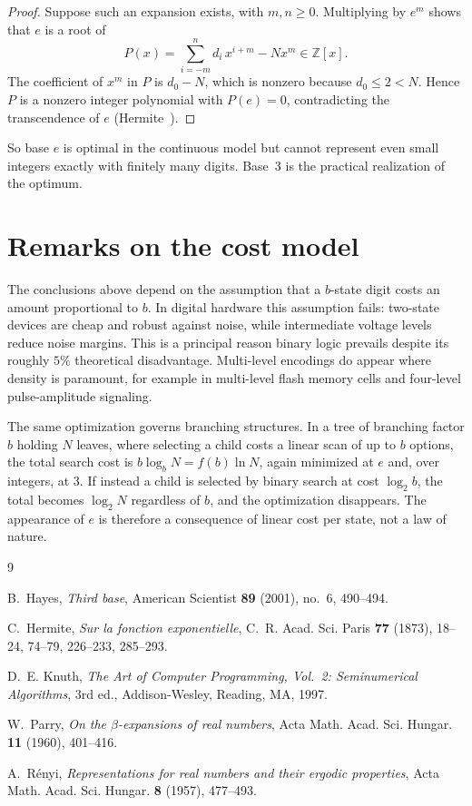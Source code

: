 \documentclass[11pt]{amsart}
\theoremstyle{definition}
\theoremstyle{remark}
\numberwithin{equation}{section}
\begin{document}
\begin{proof}
Suppose such an expansion exists, with $m,n\ge 0$. Multiplying by $e^m$ shows
that $e$ is a root of
\[
  P(x) = \sum_{i=-m}^{n} d_i\, x^{i+m} - N x^m \in \mathbb{Z}[x].
\]
The coefficient of $x^m$ in $P$ is $d_0 - N$, which is nonzero because
$d_0\le 2<N$. Hence $P$ is a nonzero integer polynomial with $P(e)=0$,
contradicting the transcendence of $e$ (Hermite~\cite{hermite}).
\end{proof}

So base $e$ is optimal in the continuous model but cannot represent
even small integers exactly with finitely many digits. Base~$3$ is the
practical realization of the optimum.

\section{Remarks on the cost model}

The conclusions above depend on the assumption that a $b$-state digit costs
an amount proportional to $b$. In digital hardware this assumption fails:
two-state devices are cheap and robust against noise, while intermediate
voltage levels reduce noise margins. This is a principal reason binary
logic prevails despite its roughly $5\%$ theoretical disadvantage. Multi-level
encodings do appear where density is paramount, for example in multi-level
flash memory cells and four-level pulse-amplitude signaling.

The same optimization governs branching structures. In a tree of branching
factor $b$ holding $N$ leaves, where selecting a child costs a linear scan of
up to $b$ options, the total search cost is $b\log_b N = f(b)\ln N$, again
minimized at $e$ and, over integers, at $3$. If instead a child is selected by
binary search at cost $\log_2 b$, the total becomes $\log_2 N$ regardless of
$b$, and the optimization disappears. The appearance of $e$ is therefore a
consequence of linear cost per state, not a law of nature.

\begin{thebibliography}{9}

B.~Hayes, \emph{Third base}, American Scientist \textbf{89} (2001), no.~6,
490--494.

C.~Hermite, \emph{Sur la fonction exponentielle}, C.~R. Acad. Sci. Paris
\textbf{77} (1873), 18--24, 74--79, 226--233, 285--293.

D.~E. Knuth, \emph{The Art of Computer Programming, Vol.~2: Seminumerical
Algorithms}, 3rd ed., Addison-Wesley, Reading, MA, 1997.

W.~Parry, \emph{On the $\beta$-expansions of real numbers}, Acta Math. Acad.
Sci. Hungar. \textbf{11} (1960), 401--416.

A.~R\'enyi, \emph{Representations for real numbers and their ergodic
properties}, Acta Math. Acad. Sci. Hungar. \textbf{8} (1957), 477--493.

\end{thebibliography}
\end{document}
